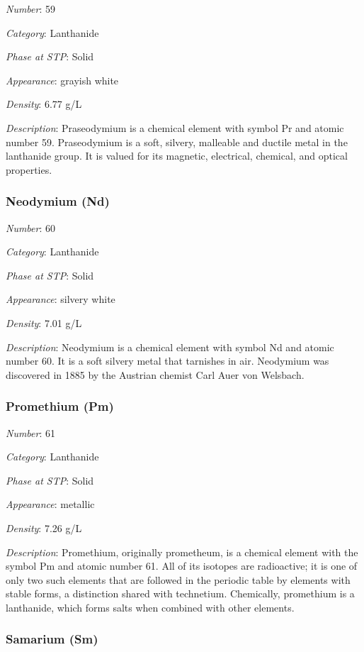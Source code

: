 \documentclass{article}
\begin{document}
\textit{Number}: 59

\textit{Category}: Lanthanide

\textit{Phase at STP}: Solid

\textit{Appearance}: grayish white

\textit{Density}: 6.77 g/L

\textit{Description}: Praseodymium is a chemical element with symbol Pr and atomic number 59. Praseodymium is a soft, silvery, malleable and ductile metal in the lanthanide group. It is valued for its magnetic, electrical, chemical, and optical properties.

\hypertarget{subsubsection::Nd}{}\subsubsection{Neodymium (Nd)}

\textit{Number}: 60

\textit{Category}: Lanthanide

\textit{Phase at STP}: Solid

\textit{Appearance}: silvery white

\textit{Density}: 7.01 g/L

\textit{Description}: Neodymium is a chemical element with symbol Nd and atomic number 60. It is a soft silvery metal that tarnishes in air. Neodymium was discovered in 1885 by the Austrian chemist Carl Auer von Welsbach.

\hypertarget{subsubsection::Pm}{}\subsubsection{Promethium (Pm)}

\textit{Number}: 61

\textit{Category}: Lanthanide

\textit{Phase at STP}: Solid

\textit{Appearance}: metallic

\textit{Density}: 7.26 g/L

\textit{Description}: Promethium, originally prometheum, is a chemical element with the symbol Pm and atomic number 61. All of its isotopes are radioactive; it is one of only two such elements that are followed in the periodic table by elements with stable forms, a distinction shared with technetium. Chemically, promethium is a lanthanide, which forms salts when combined with other elements.

\hypertarget{subsubsection::Sm}{}\subsubsection{Samarium (Sm)}
\end{document}
